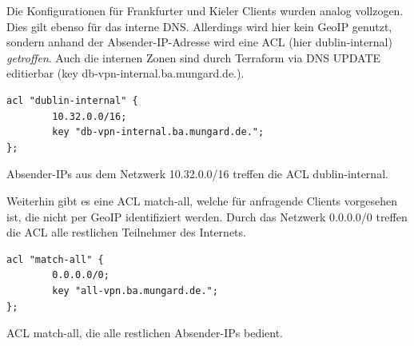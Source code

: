 Die Konfigurationen für Frankfurter und Kieler Clients wurden analog vollzogen. Dies gilt ebenso für das interne DNS. Allerdings wird hier kein GeoIP genutzt, sondern anhand der Absender-IP-Adresse wird eine ACL (hier \glqq dublin-internal\grqq{}) \textit{getroffen}. Auch die internen Zonen sind durch Terraform via DNS UPDATE editierbar (key \glqq db-vpn-internal.ba.mungard.de.\grqq{}).
\begin{listing}[h]
\begin{verbatim}
acl "dublin-internal" {
        10.32.0.0/16;
        key "db-vpn-internal.ba.mungard.de.";
};
\end{verbatim}
\caption{Absender-IPs aus dem Netzwerk 10.32.0.0/16 treffen die ACL \glqq dublin-internal\grqq{}.}
\label{view-internal-bind}
\end{listing}\FloatBarrier
Weiterhin gibt es eine ACL \glqq match-all\grqq{}, welche für anfragende Clients vorgesehen ist, die nicht per GeoIP identifiziert werden. Durch das Netzwerk 0.0.0.0/0 treffen die ACL alle restlichen Teilnehmer des Internets.
\begin{listing}[h]
\begin{verbatim}
acl "match-all" {
        0.0.0.0/0;
        key "all-vpn.ba.mungard.de.";
};
\end{verbatim}
\caption{ACL \glqq match-all\grqq{}, die alle restlichen Absender-IPs bedient.}
\label{view-matchall-bin}
\end{listing}\FloatBarrier

